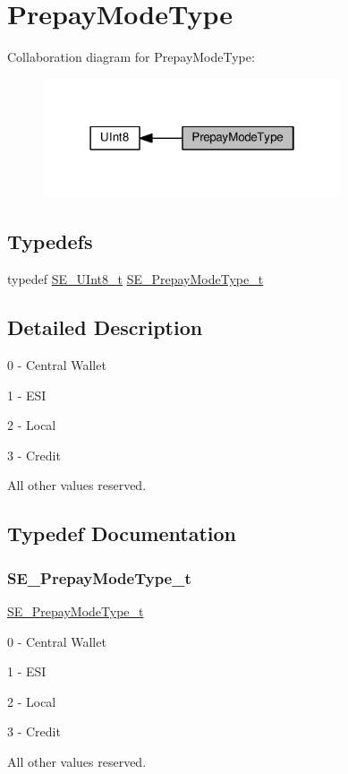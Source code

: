 \hypertarget{group__PrepayModeType}{}\section{Prepay\+Mode\+Type}
\label{group__PrepayModeType}
Collaboration diagram for Prepay\+Mode\+Type\+:\nopagebreak
\begin{figure}[H]
\begin{center}
\leavevmode
\includegraphics[width=250pt]{group__PrepayModeType}
\end{center}
\end{figure}
\subsection*{Typedefs}
\begin{DoxyCompactItemize}
\item 
typedef \hyperlink{group__UInt8_gaf7c365a1acfe204e3a67c16ed44572f5}{S\+E\+\_\+\+U\+Int8\+\_\+t} \hyperlink{group__PrepayModeType_gad5775ab7dde98ccb92880e85b9a905b7}{S\+E\+\_\+\+Prepay\+Mode\+Type\+\_\+t}
\end{DoxyCompactItemize}


\subsection{Detailed Description}
0 -\/ Central Wallet

1 -\/ E\+SI

2 -\/ Local

3 -\/ Credit

All other values reserved. 

\subsection{Typedef Documentation}
\mbox{\label{group__PrepayModeType_gad5775ab7dde98ccb92880e85b9a905b7}} 
\subsubsection{\texorpdfstring{S\+E\+\_\+\+Prepay\+Mode\+Type\+\_\+t}{SE\_PrepayModeType\_t}}
{\footnotesize\ttfamily \hyperlink{group__PrepayModeType_gad5775ab7dde98ccb92880e85b9a905b7}{S\+E\+\_\+\+Prepay\+Mode\+Type\+\_\+t}}

0 -\/ Central Wallet

1 -\/ E\+SI

2 -\/ Local

3 -\/ Credit

All other values reserved. 